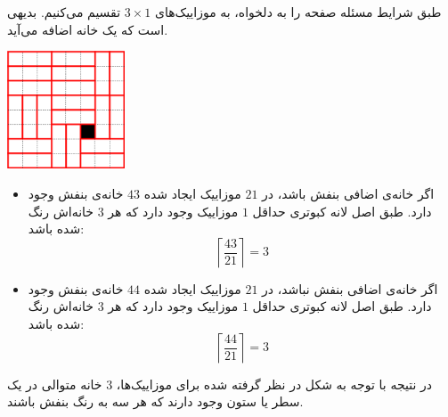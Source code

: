 \p
طبق شرایط مسئله صفحه را به دلخواه، به موزاییک‌های 
$3\times1$ 
تقسیم می‌کنیم. بدیهی است که یک خانه اضافه می‌آید.
	\p
\begin{center}
    \includegraphics[height=3.5cm]{0.png}
\end{center}
\vspace*{+0.5cm}
\begin{itemize}
	\item 
اگر خانه‌ی اضافی بنفش باشد، در
$21$ 
موزاییک ایجاد شده
$43$
خانه‌ی بنفش وجود دارد. طبق اصل لانه کبوتری حداقل 
$1$
موزاییک وجود دارد که هر 
$3$ 
خانه‌اش رنگ شده باشد:
$$\left \lceil \frac{43}{21} \right \rceil = 3$$ 
    \item 
اگر خانه‌ی اضافی بنفش نباشد، در
$21$ 
موزاییک ایجاد شده 
$44$
خانه‌ی بنفش وجود دارد. طبق اصل لانه کبوتری حداقل 
$1$
موزاییک وجود دارد که هر 
$3$ 
خانه‌اش رنگ شده باشد:
$$\left \lceil \frac{44}{21} \right \rceil = 3$$ 
\end{itemize}
\p
در نتیجه
با توجه به شکل در نظر گرفته شده برای موزاییک‌ها، 	  
$3$
 خانه متوالی در یک سطر یا ستون وجود دارند که هر سه به رنگ بنفش باشند.
